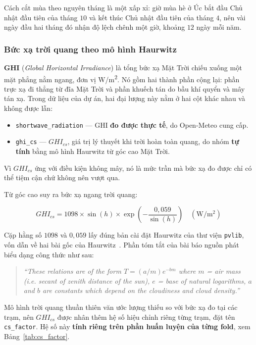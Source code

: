 \documentclass[12pt, a4paper]{report}
\begin{document}
Cách cắt mùa theo nguyên tháng là một xấp xỉ: giờ mùa hè ở Úc bắt đầu Chủ nhật đầu
tiên của tháng $10$ và kết thúc Chủ nhật đầu tiên của tháng $4$, nên vài ngày đầu hai tháng
đó nhận độ lệch chênh một giờ, khoảng $12$ ngày mỗi năm.

\subsubsection{Bức xạ trời quang theo mô hình Haurwitz}

\textbf{GHI} (\textit{Global Horizontal Irradiance}) là tổng bức xạ Mặt Trời chiếu
xuống một mặt phẳng nằm ngang, đơn vị W/m\textsuperscript{2}. Nó gồm hai thành phần cộng
lại: phần trực xạ đi thẳng từ đĩa Mặt Trời và phần khuếch tán do bầu khí quyển và mây tán
xạ. Trong dữ liệu của dự án, hai đại lượng này nằm ở hai cột khác nhau và không được
lẫn:

\begin{itemize}
    \item \texttt{shortwave\_radiation} --- GHI \textbf{đo được thực tế}, do Open-Meteo cung cấp.
    \item \texttt{ghi\_cs} --- $GHI_{cs}$, giá trị lý thuyết khi trời hoàn toàn quang, do nhóm
    \textbf{tự tính} bằng mô hình Haurwitz từ góc cao Mặt Trời.
\end{itemize}

Vì $GHI_{cs}$ ứng với điều kiện không mây, nó là mức trần mà bức xạ đo được chỉ có thể tiệm
cận chứ không nên vượt qua.

Từ góc cao suy ra bức xạ ngang trời quang:

\begin{equation}
GHI_{cs} = 1098 \times \sin(h) \times \exp\!\left(-\frac{0{,}059}{\sin(h)}\right)
\quad (\mathrm{W/m^2})
\end{equation}

Cặp hằng số $1098$ và $0{,}059$ lấy đúng bản cài đặt Haurwitz của thư viện \texttt{pvlib},
vốn dẫn về hai bài gốc của Haurwitz~\cite{haurwitz1945}. Phần tóm tắt của bài báo
nguồn phát biểu dạng công thức như sau:

\begin{quote}\small
\textit{``These relations are of the form $T = (a/m)e^{-bm}$ where $m$ = air mass (i.e. secant of zenith distance of the sun), $e$ = base of natural logarithms, $a$ and $b$ are constants which depend on the cloudiness and cloud density.''}
\end{quote}


Mô hình trời quang thuần thiên văn ước lượng thiếu so với bức xạ đo tại các trạm, nên
$GHI_{cs}$ được nhân thêm hệ số hiệu chỉnh riêng từng trạm, đặt tên \texttt{cs\_factor}. Hệ số
này \textbf{tính riêng trên phần huấn luyện của từng fold}, xem Bảng~\ref{tab:cs_factor}.
\end{document}
